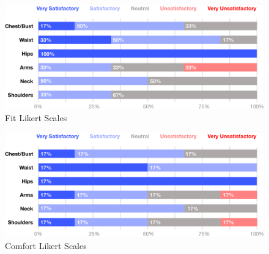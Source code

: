 \begin{figure} [htb]
    \centering
    \includegraphics[width = \textwidth]{Images/fit likert stacked bar.png}
    \caption{Fit Likert Scales}
\end{figure}
\begin{figure} [htb]
    \centering
    \includegraphics[width = \textwidth]{Images/comfort likert stacked bar.png}
    \caption{Comfort Likert Scales}
\end{figure}


